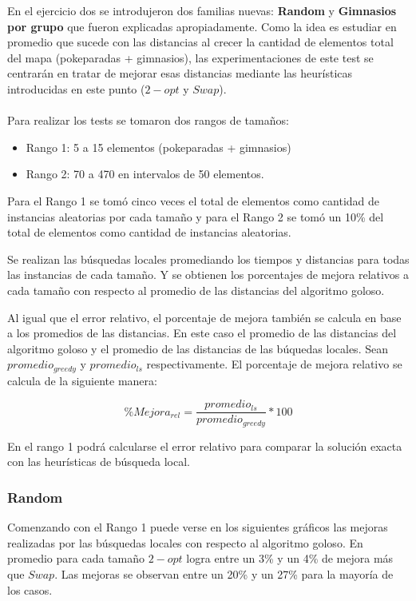 \newpage

En el ejercicio dos se introdujeron dos familias nuevas: \textbf{Random} y \textbf{Gimnasios por grupo} que fueron explicadas apropiadamente. Como la idea es estudiar en promedio que sucede con las distancias al crecer la cantidad de elementos total del mapa (pokeparadas + gimnasios), las experimentaciones de este test se centrarán en tratar de mejorar esas distancias mediante las heurísticas introducidas en este punto ($2-opt$ y $Swap$).\\\\

Para realizar los tests se tomaron dos rangos de tamaños:
\begin{itemize}
\item Rango 1: 5 a 15 elementos (pokeparadas + gimnasios)
\item Rango 2: 70 a 470 en intervalos de 50 elementos.
\end{itemize}

Para el Rango 1 se tomó cinco veces el total de elementos como cantidad de instancias aleatorias por cada tamaño y para el Rango 2 se tomó un 10\% del total de elementos como cantidad de instancias aleatorias.

Se realizan las búsquedas locales promediando los tiempos y distancias para todas las instancias de cada tamaño. Y se obtienen los porcentajes de mejora relativos a cada tamaño con respecto al promedio de las distancias del algoritmo goloso.

Al igual que el error relativo, el porcentaje de mejora también se calcula en base a los promedios de las distancias. En este caso el promedio de las distancias del algoritmo goloso y el promedio de las distancias de las búquedas locales. Sean $promedio_{greedy}$ y $promedio_{ls}$ respectivamente. El porcentaje de mejora relativo se calcula de la siguiente manera:

\begin{equation}
\%Mejora_{rel} = \frac{promedio_{ls}}{promedio_{greedy}} \ast 100
\end{equation}

En el rango 1 podrá calcularse el error relativo para comparar la solución exacta con las heurísticas de búsqueda local.

\subsubsection*{Random}

Comenzando con el Rango 1 puede verse en los siguientes gráficos las mejoras realizadas por las búsquedas locales con respecto al algoritmo goloso. En promedio para cada tamaño $2-opt$ logra entre un 3\% y un 4\% de mejora más que $Swap$. Las mejoras se observan entre un 20\% y un 27\% para la mayoría de los casos.
\\\\

